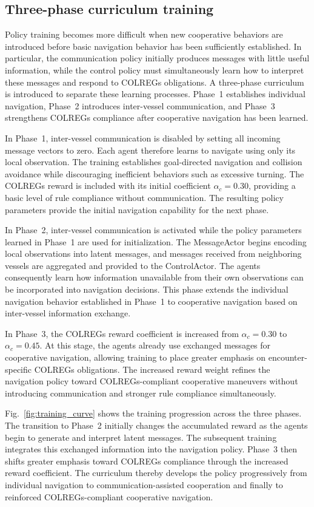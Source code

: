 \documentclass[final,5p,times,twocolumn]{elsarticle}
\begin{document}
\subsection{Three-phase curriculum training}
{\color{violet}
Policy training becomes more difficult when new cooperative behaviors
are introduced before basic navigation behavior has been sufficiently
established. In particular, the communication policy initially produces
messages with little useful information, while the control policy must
simultaneously learn how to interpret these messages and respond to
COLREGs obligations. A three-phase curriculum is introduced to separate
these learning processes. Phase~1 establishes individual navigation,
Phase~2 introduces inter-vessel communication, and Phase~3 strengthens
COLREGs compliance after cooperative navigation has been learned.

In Phase~1, inter-vessel communication is disabled by setting all incoming message vectors to zero. Each agent therefore learns to navigate using only its local observation. The training establishes goal-directed navigation and collision avoidance while discouraging inefficient behaviors such as excessive turning. The COLREGs reward is included with its initial coefficient $\alpha_c=0.30$, providing a basic level of rule compliance without communication. The resulting policy parameters provide the initial navigation capability for the next phase. 

In Phase~2, inter-vessel communication is activated while the policy parameters learned in Phase~1 are used for initialization. The MessageActor begins encoding local observations into latent messages, and messages received from neighboring vessels are aggregated and provided to the ControlActor. The agents consequently learn how information unavailable from their own observations can be incorporated into navigation decisions. This phase extends the individual navigation behavior established in Phase~1 to cooperative navigation based on inter-vessel information exchange. 

In Phase~3, the COLREGs reward coefficient is increased from $\alpha_c=0.30$ to $\alpha_c=0.45$. At this stage, the agents already use exchanged messages for cooperative navigation, allowing training to place greater emphasis on encounter-specific COLREGs obligations. The increased reward weight refines the navigation policy toward COLREGs-compliant cooperative maneuvers without introducing communication and stronger rule compliance simultaneously. 

Fig.~\ref{fig:training_curve} shows the training progression across the three phases. The transition to Phase~2 initially changes the accumulated reward as the agents begin to generate and interpret latent messages. The subsequent training integrates this exchanged information into the navigation policy. Phase~3 then shifts greater emphasis toward COLREGs compliance through the increased reward coefficient. The curriculum thereby develops the policy progressively from individual navigation to communication-assisted cooperation and finally to reinforced COLREGs-compliant cooperative navigation.
}
\end{document}
